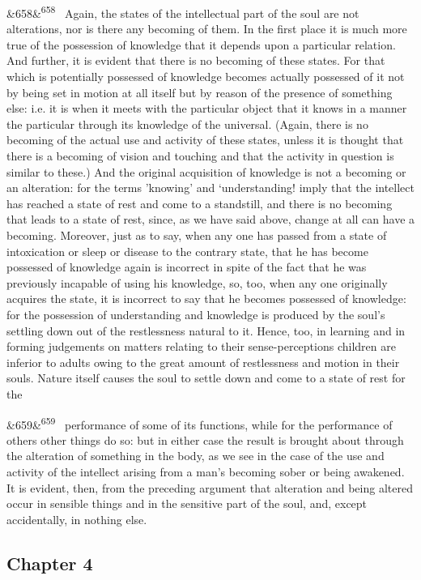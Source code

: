 \documentclass[12pt]{article}
\newcommand{\para}[1][]{\par\noindent\ifx&#1&\else\textsuperscript{\footnotesize #1}~\fi}
\begin{document}
\para[658] Again, the states of the intellectual part of the soul are not alterations, nor is there any becoming of them. In the first place it is much more true of the possession of knowledge that it depends upon a particular relation. And further, it is evident that there is no becoming of these states. For that which is potentially possessed of knowledge becomes actually possessed of it not by being set in motion at all itself but by reason of the presence of something else: i.e. it is when it meets with the particular object that it knows in a manner the particular through its knowledge of the universal. (Again, there is no becoming of the actual use and activity of these states, unless it is thought that there is a becoming of vision and touching and that the activity in question is similar to these.) And the original acquisition of knowledge is not a becoming or an alteration: for the terms 'knowing' and ‘understanding! imply that the intellect has reached a state of rest and come to a standstill, and there is no becoming that leads to a state of rest, since, as we have said above, change at all can have a becoming. Moreover, just as to say, when any one has passed from a state of intoxication or sleep or disease to the contrary state, that he has become possessed of knowledge again is incorrect in spite of the fact that he was previously incapable of using his knowledge, so, too, when any one originally acquires the state, it is incorrect to say that he becomes possessed of knowledge: for the possession of understanding and knowledge is produced by the soul's settling down out of the restlessness natural to it. Hence, too, in learning and in forming judgements on matters relating to their sense-perceptions children are inferior to adults owing to the great amount of restlessness and motion in their souls. Nature itself causes the soul to settle down and come to a state of rest for the

\para[659] performance of some of its functions, while for the performance of others other things do so: but in either case the result is brought about through the alteration of something in the body, as we see in the case of the use and activity of the intellect arising from a man's becoming sober or being awakened. It is evident, then, from the preceding argument that alteration and being altered occur in sensible things and in the sensitive part of the soul, and, except accidentally, in nothing else.

\subsection*{Chapter 4}
\end{document}
